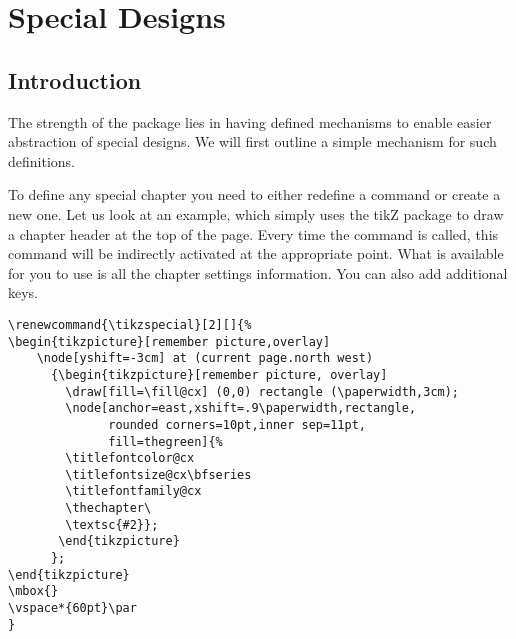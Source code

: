 \@specialtrue

\chapter{Special Designs}
\section{Introduction}



The strength of the package lies in having defined mechanisms to enable easier abstraction of special designs.
We will first outline a simple mechanism for such definitions.

To define any special chapter you need to either redefine a command or create a new one. Let us look at
an example, which simply uses the tikZ package to draw a chapter header at the top of the page. Every time the  command is called, this command will be indirectly activated at the appropriate point.
What is available for you to use is all the chapter settings information. You can also add additional keys.

\begin{tcolorbox}
\begin{lstlisting}
\renewcommand{\tikzspecial}[2][]{%
\begin{tikzpicture}[remember picture,overlay]
    \node[yshift=-3cm] at (current page.north west)
      {\begin{tikzpicture}[remember picture, overlay]
        \draw[fill=\fill@cx] (0,0) rectangle (\paperwidth,3cm);
        \node[anchor=east,xshift=.9\paperwidth,rectangle,
              rounded corners=10pt,inner sep=11pt,
              fill=thegreen]{%
        \titlefontcolor@cx
        \titlefontsize@cx\bfseries
        \titlefontfamily@cx
        \thechapter\
        \textsc{#2}};
       \end{tikzpicture}
      };
\end{tikzpicture}
\mbox{}
\vspace*{60pt}\par
}
\end{lstlisting}
\end{tcolorbox}




